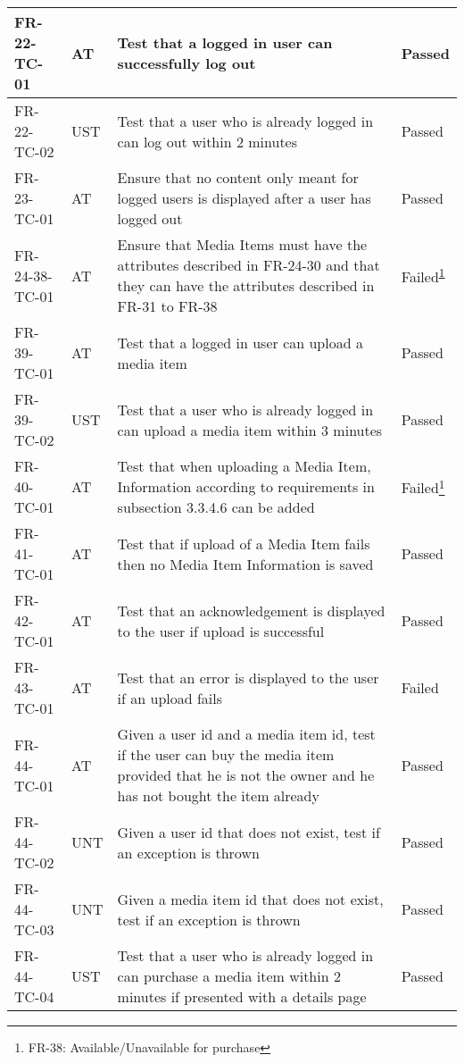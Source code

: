 \documentclass[../report.tex]{subfiles}
\newcommand{\footnoteref}[1]{\textsuperscript{\ref{#1}}}
\begin{document}
\begin{longtable}{|L{2.1cm}|L{1cm}|L{12.4cm}|L{1.4cm}|}
FR-22-TC-01&AT&Test that a logged in user can successfully log out&Passed  \\ \hline
FR-22-TC-02&UST&Test that a user who is already logged in can log out within 2 minutes&Passed  \\ \hline
FR-23-TC-01&AT&Ensure that no content only meant for logged users is displayed after a user has logged out&Passed  \\ \hline
FR-24-38-TC-01&AT&Ensure that Media Items must have the attributes described in FR-24-30 and that they can have the attributes described in FR-31 to FR-38&Failed\footnoteref{note1}  \\ \hline
FR-39-TC-01&AT&Test that a logged in user can upload a media item&Passed  \\ \hline
FR-39-TC-02&UST&Test that a user who is already logged in can upload a media item within 3 minutes&Passed  \\ \hline
FR-40-TC-01&AT&Test that when uploading a Media Item, Information according to requirements in subsection 3.3.4.6 can be added&Failed\footnote{\label{note1} FR-38: Available/Unavailable for purchase}  \\ \hline
FR-41-TC-01&AT&Test that if upload of a Media Item fails then no Media Item Information is saved&Passed  \\ \hline
FR-42-TC-01&AT&Test that an acknowledgement is displayed to the user if upload is successful&Passed  \\ \hline
FR-43-TC-01&AT&Test that an error is displayed to the user if an upload fails&Failed  \\ \hline
FR-44-TC-01&AT&Given a user id and a media item id, test if the user can buy the media item provided that he is not the owner and he has not bought the item already&Passed  \\ \hline
FR-44-TC-02&UNT&Given a user id that does not exist, test if an exception is thrown&Passed  \\ \hline
FR-44-TC-03&UNT&Given a media item id that does not exist, test if an exception is thrown&Passed  \\ \hline
FR-44-TC-04&UST&Test that a user who is already logged in can purchase a media item within 2 minutes if presented with a details page&Passed  \\ \hline

\end{longtable}
\end{document}
